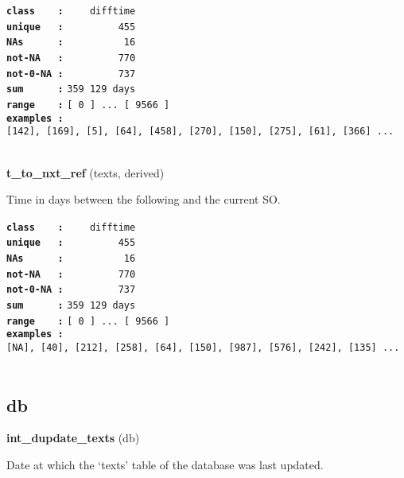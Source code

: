 \documentclass[]{article}
\begin{document}
\textbf{\texttt{class\ \ \ \ :}} \texttt{~~~~difftime}\\
\textbf{\texttt{unique\ \ \ :}} \texttt{~~~~~~~~~455}\\
\textbf{\texttt{NAs\ \ \ \ \ \ :}} \texttt{~~~~~~~~~~16}\\
\textbf{\texttt{not-NA\ \ \ :}} \texttt{~~~~~~~~~770}\\
\textbf{\texttt{not-0-NA\ :}} \texttt{~~~~~~~~~737}\\
\textbf{\texttt{sum\ \ \ \ \ \ :}} \texttt{359~129\ days}\\
\textbf{\texttt{range\ \ \ \ :}}
\texttt{{[}\ 0\ {]}\ ...\ {[}\ 9566\ {]}}\\
\textbf{\texttt{examples\ :}}
\texttt{{[}142{]},\ {[}169{]},\ {[}5{]},\ {[}64{]},\ {[}458{]},\ {[}270{]},\ {[}150{]},\ {[}275{]},\ {[}61{]},\ {[}366{]}\ ...}\\

~

\textbf{t\_to\_nxt\_ref} (texts, derived)

Time in days between the following and the current SO.

\textbf{\texttt{class\ \ \ \ :}} \texttt{~~~~difftime}\\
\textbf{\texttt{unique\ \ \ :}} \texttt{~~~~~~~~~455}\\
\textbf{\texttt{NAs\ \ \ \ \ \ :}} \texttt{~~~~~~~~~~16}\\
\textbf{\texttt{not-NA\ \ \ :}} \texttt{~~~~~~~~~770}\\
\textbf{\texttt{not-0-NA\ :}} \texttt{~~~~~~~~~737}\\
\textbf{\texttt{sum\ \ \ \ \ \ :}} \texttt{359~129\ days}\\
\textbf{\texttt{range\ \ \ \ :}}
\texttt{{[}\ 0\ {]}\ ...\ {[}\ 9566\ {]}}\\
\textbf{\texttt{examples\ :}}
\texttt{{[}NA{]},\ {[}40{]},\ {[}212{]},\ {[}258{]},\ {[}64{]},\ {[}150{]},\ {[}987{]},\ {[}576{]},\ {[}242{]},\ {[}135{]}\ ...}\\

~

\subsection{db}\label{db}

\textbf{int\_dupdate\_texts} (db)

Date at which the `texts' table of the database was last updated.
\end{document}

